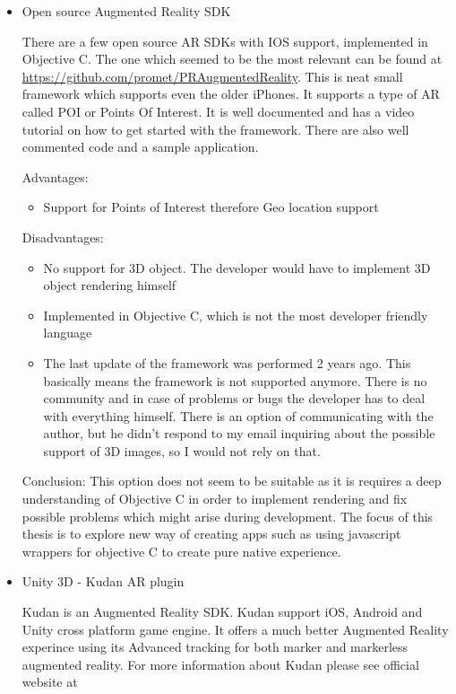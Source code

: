 \documentclass[thesis=M,english]{FITthesis}[2012/10/20]
\begin{document}
\begin{itemize}
	\item{Open source Augmented Reality SDK}
	
	There are a few open source AR SDKs with IOS support, implemented in Objective C. The one which seemed to be the most relevant can be found at  \url{https://github.com/promet/PRAugmentedReality}. This is neat small framework which supports even the older iPhones. It supports a type of AR called POI or Points Of Interest. It is well documented and has a video tutorial on how to get started with the framework. There are also well commented code and a sample application.
	
	Advantages:
	\begin{itemize}
		\item{Support for Points of Interest} therefore Geo location support
	\end{itemize}
	
	Disadvantages:
	\begin{itemize}
		\item{No support for 3D object. The developer would have to implement 3D object rendering himself}
		\item{Implemented in Objective C, which is not the most developer friendly language}
		\item{The last update of the framework was performed 2 years ago. This basically means the framework is not supported anymore. There is no community and in case of problems or bugs the developer has to deal with everything himself. There is an option of communicating with the author, but he didn't respond to my email inquiring about the possible support of 3D images, so I would not rely on that.}
	\end{itemize}

	Conclusion:
	This option does not seem to be suitable as it is requires a deep understanding of Objective C in order to implement rendering and fix possible problems which might arise during development. The focus of this thesis is to explore new way of creating apps such as using javascript wrappers for objective C to create pure native experience.

	\item{Unity 3D - Kudan AR plugin}
	
	Kudan is an Augmented Reality SDK.  Kudan support iOS, Android and Unity cross platform game engine. It offers a much better Augmented Reality experince using its Advanced tracking for both marker and markerless augmented reality. For more information about Kudan please see official website at \cite{kudan}
	

\end{itemize}
\end{document}
